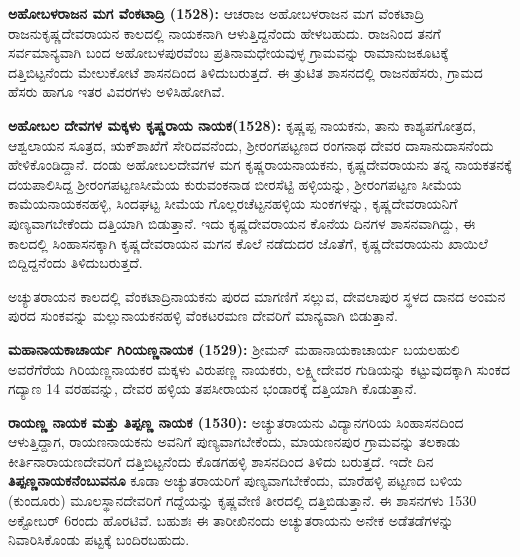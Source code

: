 \textbf{ಅಹೋಬಳರಾಜನ ಮಗ ವೆಂಕಟಾದ್ರಿ (1528):} ಆಚರಾಜ ಅಹೋಬಳರಾಜನ ಮಗ ವೆಂಕಟಾದ್ರಿ ರಾಜನು\break ಕೃಷ್ಣದೇವರಾಯನ ಕಾಲದಲ್ಲಿ ನಾಯಕನಾಗಿ ಆಳುತ್ತಿದ್ದನೆಂದು ಹೇಳಬಹುದು. ರಾಜನಿಂದ ತನಗೆ ಸರ್ವಮಾನ್ಯವಾಗಿ ಬಂದ ಅಹೋಬಳಪುರವೆಂಬ ಪ್ರತಿನಾಮಧೇಯವುಳ್ಳ ಗ್ರಾಮವನ್ನು ರಾಮಾನುಜಕೂಟಕ್ಕೆ ದತ್ತಿಬಿಟ್ಟನೆಂದು ಮೇಲುಕೋಟೆ ಶಾಸನದಿಂದ ತಿಳಿದುಬರುತ್ತದೆ. ಈ ತ್ರುಟಿತ ಶಾಸನದಲ್ಲಿ ರಾಜನಹೆಸರು, ಗ್ರಾಮದ ಹೆಸರು ಹಾಗೂ ಇತರ ವಿವರಗಳು ಅಳಿಸಿಹೋಗಿವೆ.

\textbf{ಅಹೋಬಲ ದೇವಗಳ ಮಕ್ಕಳು ಕೃಷ್ಣರಾಯ ನಾಯಕ(1528):} ಕೃಷ್ಣಪ್ಪ ನಾಯಕನು, ತಾನು ಕಾಶ್ಯಪಗೋತ್ರದ, ಆಶ್ವಲಾಯನ ಸೂತ್ರದ, ಋಕ್​ಶಾಖೆಗೆ ಸೇರಿದವನೆಂದು, ಶ‍್ರೀರಂಗಪಟ್ಟಣದ ರಂಗನಾಥ ದೇವರ ದಾಸಾನುದಾಸನೆಂದು ಹೇಳಿಕೊಂಡಿದ್ದಾನೆ. ದಂಡು ಅಹೋಬಲದೇವಗಳ ಮಗ ಕೃಷ್ಣರಾಯನಾಯಕನು, ಕೃಷ್ಣದೇವರಾಯನು ತನ್ನ ನಾಯಕತನಕ್ಕೆ ದಯಪಾಲಿಸಿದ್ದ ಶ‍್ರೀರಂಗಪಟ್ಟಣಸೀಮೆಯ ಕುರುವಂಕನಾಡ ಬೀರಸೆಟ್ಟಿ ಹಳ್ಳಿಯನ್ನು, ಶ‍್ರೀರಂಗಪಟ್ಟಣ ಸೀಮೆಯ ಕಾಮೆಯನಾಯಕನಹಳ್ಳಿ, ಸಿಂದಘಟ್ಟ ಸೀಮೆಯ ಗೊಲ್ಲರಚೆಟ್ಟನಹಳ್ಳಿಯ ಸುಂಕಗಳನ್ನು, ಕೃಷ್ಣದೇವರಾಯನಿಗೆ ಪುಣ್ಯವಾಗ\-ಬೇಕೆಂದು ದತ್ತಿಯಾಗಿ ಬಿಡುತ್ತಾನೆ. ಇದು ಕೃಷ್ಣದೇವರಾಯನ ಕೊನೆಯ ದಿನಗಳ ಶಾಸನವಾಗಿದ್ದು, ಈ ಕಾಲದಲ್ಲಿ ಸಿಂಹಾಸನಕ್ಕಾಗಿ ಕೃಷ್ಣದೇವರಾಯನ ಮಗನ ಕೊಲೆ ನಡೆದುದರ ಜೊತೆಗೆ, ಕೃಷ್ಣದೇವರಾಯನು ಖಾಯಿಲೆ ಬಿದ್ದಿದ್ದನೆಂದು ತಿಳಿದುಬರುತ್ತದೆ.

ಅಚ್ಯುತರಾಯನ ಕಾಲದಲ್ಲಿ ವೆಂಕಟಾದ್ರಿನಾಯಕನು ಪುರದ ಮಾಗಣಿಗೆ ಸಲ್ಲುವ, ದೇವಲಾಪುರ ಸ್ಥಳದ ದಾನದ \hbox{ಅಂಮನ} ಪುರದ ಸುಂಕವನ್ನು ಮಲ್ಲುನಾಯಕನಹಳ್ಳಿ ವೆಂಕಟರಮಣ ದೇವರಿಗೆ ಮಾನ್ಯವಾಗಿ ಬಿಡುತ್ತಾನೆ.

\vskip 3pt

\textbf{ಮಹಾನಾಯಕಾಚಾರ್ಯ ಗಿರಿಯಣ್ಣನಾಯಕ (1529):} ಶ‍್ರೀಮನ್​ ಮಹಾನಾಯಕಾಚಾರ್ಯ ಬಯಲಹುಲಿ ಅವರೆಗೆರೆಯ ಗಿರಿಯಣ್ಣನಾಯಕರ ಮಕ್ಕಳು ವಿರುಪಣ್ಣ ನಾಯಕರು, ಲಕ್ಷ್ಮೀದೇವರ ಗುಡಿಯನ್ನು ಕಟ್ಟುವುದಕ್ಕಾಗಿ ಸುಂಕದ ಗದ್ಯಾಣ 14 ವರಹವನ್ನು, ದೇವರ ಹಳ್ಳಿಯ ತಪಸೀರಾಯನ ಭಂಡಾರಕ್ಕೆ ದತ್ತಿಯಾಗಿ ಕೊಡುತ್ತಾನೆ.

\vskip 3pt

\textbf{ರಾಯಣ್ಣ ನಾಯಕ ಮತ್ತು ತಿಪ್ಪಣ್ಣ ನಾಯಕ (1530):} ಅಚ್ಯುತರಾಯನು ವಿದ್ಯಾನಗರಿಯ ಸಿಂಹಾಸನದಿಂದ ಆಳುತ್ತಿದ್ದಾಗ, ರಾಯಣ\-ನಾಯಕನು ಅವನಿಗೆ ಪುಣ್ಯವಾಗಬೇಕೆಂದು, ಮಾಯಣನಪುರ ಗ್ರಾಮವನ್ನು ತಲಕಾಡು ಕೀರ್ತಿ\-ನಾರಾಯಣದೇವರಿಗೆ ದತ್ತಿಬಿಟ್ಟ\-ನೆಂದು ಕೊಡಗಹಳ್ಳಿ ಶಾಸನದಿಂದ ತಿಳಿದು ಬರುತ್ತದೆ. ಇದೇ ದಿನ \textbf{ತಿಪ್ಪಣ್ಣನಾಯಕನೆಂಬುವನೂ} ಕೂಡಾ ಅಚ್ಯುತರಾಯರಿಗೆ ಪುಣ್ಯವಾಗಬೇಕೆಂದು, ಮಾರೆಹಳ್ಳಿ ಪಟ್ಟಣದ ಬಳಿಯ (ಕುಂದೂರು) ಮೂಲಸ್ಥಾನದೇವರಿಗೆ ಗದ್ದೆಯನ್ನು ಕೃಷ್ಣವೇಣಿ ತೀರದಲ್ಲಿ ದತ್ತಿಬಿಡುತ್ತಾನೆ. ಈ ಶಾಸನಗಳು 1530 ಅಕ್ಟೋಬರ್​ 6ರಂದು ಹೊರಟಿವೆ. ಬಹುಶಃ ಈ ತಾರೀಖಿನಂದು ಅಚ್ಯುತರಾಯನು ಅನೇಕ ಅಡೆತಡೆಗಳನ್ನು ನಿವಾರಿಸಿಕೊಂಡು ಪಟ್ಟಕ್ಕೆ ಬಂದಿರಬಹುದು.

